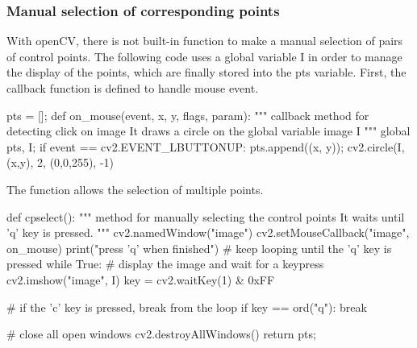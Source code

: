 \subsubsection{Manual selection of corresponding points}
With openCV, there is not built-in function to make a manual selection of pairs of control points. The following code uses a global variable I in order to manage the display of the points, which are finally stored into the pts variable. First, the callback function  is defined to handle mouse event. 

\begin{python}
pts = [];
def on_mouse(event, x, y, flags, param):
    """
    callback method for detecting click on image
    It draws a circle on the global variable image I
    """
    global pts, I;
    if event == cv2.EVENT_LBUTTONUP:
        pts.append((x, y));
        cv2.circle(I,(x,y), 2, (0,0,255), -1)
\end{python}
The function  allows the selection of multiple points.
\begin{python}
def cpselect():
    """
    method for manually selecting the control points
    It waits until 'q' key is pressed.
    """
    cv2.namedWindow("image")
    cv2.setMouseCallback("image", on_mouse)
    print("press 'q' when finished")
    # keep looping until the 'q' key is pressed
    while True:
    	# display the image and wait for a keypress
    	cv2.imshow("image", I)
    	key = cv2.waitKey(1) & 0xFF
    
    	# if the 'c' key is pressed, break from the loop
    	if key == ord("q"):
    		break

    # close all open windows
    cv2.destroyAllWindows()
    return pts;
\end{python}

